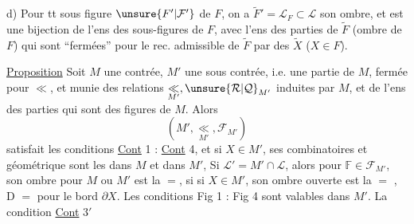 d)  Pour tt sous figure $\unsure{F'|\mathcal F'}$ de $F$, on a  $\widetilde F'=\mathcal L_F\subset \mathcal L$ son ombre, et
est une bijection de l'ens des sous-figures de $F$, avec l'ens des parties de $\widetilde F$ (ombre de $F$) qui sont ``fermées'' pour le rec. admissible de $\widetilde F$ par  des $\widetilde X$ ($X\in F$).

\uline{Proposition} Soit $M$ une contrée, $M'$ une sous contrée,  i.e. une partie de $M$, fermée pour $\ll$, et munie des relations $\underset{M'}{\ll},\unsure{\mathcal R|\mathcal Q}_{M'}$ induites par $M$, et de l'ens  des parties   qui sont des figures de $M$. Alors
\[
(M',\underset{M'}{\ll},\mathcal F_{M'})
\]
satisfait les conditions \uline{Cont} 1 : \uline{Cont} 4, et si $X\in M'$, ses  combinatoires et géométrique sont les  dans $M$ et dans $M'$, Si $\mathcal L'=M'\cap \mathcal L$, alors pour  $\mathbb F\in\mathcal F_{M'}$, son ombre  pour $M$ ou $M'$ est la $=$, si si $X\in M'$,  son ombre ouverte est la $=$ , D $=$ pour le bord $\partial X$. Les conditions Fig 1 : Fig 4 sont valables dans $M'$. La condition \uline{Cont} $3'$  
